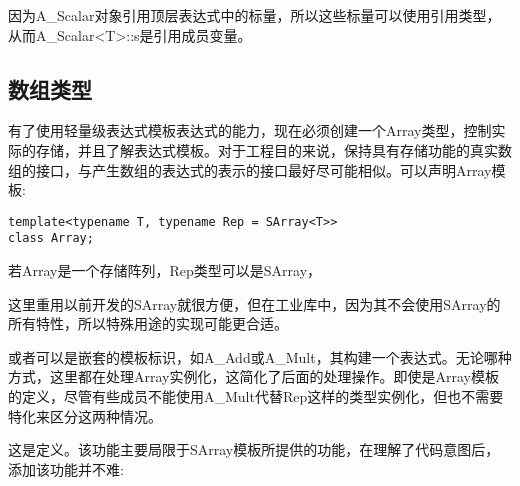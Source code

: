 因为A\_Scalar对象引用顶层表达式中的标量，所以这些标量可以使用引用类型，从而A\_Scalar<T>::s是引用成员变量。

\subsection{数组类型}

有了使用轻量级表达式模板表达式的能力，现在必须创建一个Array类型，控制实际的存储，并且了解表达式模板。对于工程目的来说，保持具有存储功能的真实数组的接口，与产生数组的表达式的表示的接口最好尽可能相似。可以声明Array模板:

\begin{lstlisting}[style=styleCXX]
template<typename T, typename Rep = SArray<T>>
class Array;
\end{lstlisting}

若Array是一个存储阵列，Rep类型可以是SArray，

\begin{tcolorbox}[colback=webgreen!5!white,colframe=webgreen!75!black]
\hspace*{0.75cm}这里重用以前开发的SArray就很方便，但在工业库中，因为其不会使用SArray的所有特性，所以特殊用途的实现可能更合适。
\end{tcolorbox}

或者可以是嵌套的模板标识，如A\_Add或A\_Mult，其构建一个表达式。无论哪种方式，这里都在处理Array实例化，这简化了后面的处理操作。即使是Array模板的定义，尽管有些成员不能使用A\_Mult代替Rep这样的类型实例化，但也不需要特化来区分这两种情况。

这是定义。该功能主要局限于SArray模板所提供的功能，在理解了代码意图后，添加该功能并不难:

